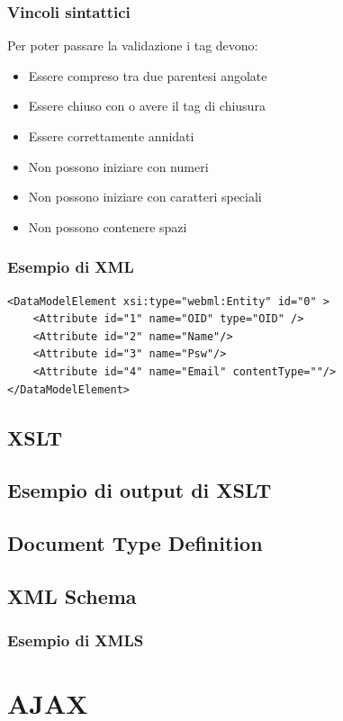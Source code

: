 \documentclass{beamer}
\begin{document}
\begin{frame}
    \frametitle{Vincoli sintattici}
    Per poter passare la validazione i tag devono:
    \begin{itemize}
    \item <2->Essere compreso tra due parentesi angolate 
    \item <3->Essere chiuso con \/ o avere il tag di chiusura
    \item <4->Essere correttamente annidati 
    \item <5->Non possono iniziare con numeri 
    \item <6->Non possono iniziare con caratteri speciali
    \item <7->Non possono contenere spazi 
    \end{itemize}
\end{frame}


\begin{frame}[fragile]
    \frametitle{Esempio di XML}
    \begin{verbatim}
<DataModelElement xsi:type="webml:Entity" id="0" >       
    <Attribute id="1" name="OID" type="OID" /> 
    <Attribute id="2" name="Name"/> 
    <Attribute id="3" name="Psw"/> 
    <Attribute id="4" name="Email" contentType=""/> 
</DataModelElement> 
    \end{verbatim}
\end{frame}

\subsection{XSLT}
\subsection{Esempio di output di XSLT}
\subsection{Document Type Definition}
\subsection{XML Schema}
\subsubsection{Esempio di XMLS}

\section{AJAX}
\end{document}
